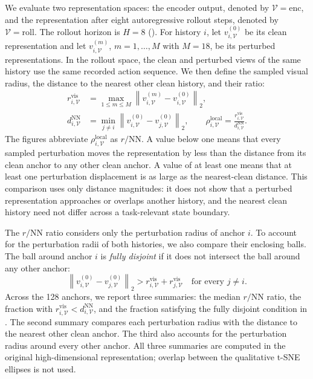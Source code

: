 We evaluate two representation spaces: the encoder output, denoted by
$\mathcal V=\mathrm{enc}$, and the representation after eight autoregressive
rollout steps, denoted by $\mathcal V=\mathrm{roll}$. The rollout horizon is
$H=8$ (). For history $i$, let
$v_{i,\mathcal V}^{(0)}$ be its clean representation and let
$v_{i,\mathcal V}^{(m)}$, $m=1,\ldots,M$ with $M=18$, be its perturbed
representations. In the rollout space, the clean and perturbed views of the
same history use the same recorded action sequence. We then define the sampled
visual radius, the distance to the nearest other clean history, and their ratio:
\begin{align}
r_{i,\mathcal V}^{\mathrm{vis}}
&=\max_{1\leq m\leq M}
\left\|v_{i,\mathcal V}^{(m)}-v_{i,\mathcal V}^{(0)}\right\|_2,
\nonumber\\
d_{i,\mathcal V}^{\mathrm{NN}}
&=\min_{j\neq i}
\left\|v_{i,\mathcal V}^{(0)}-v_{j,\mathcal V}^{(0)}\right\|_2,
\qquad
\rho_{i,\mathcal V}^{\mathrm{local}}
=\frac{r_{i,\mathcal V}^{\mathrm{vis}}}
{d_{i,\mathcal V}^{\mathrm{NN}}}.
\label{eq:local-radius-spacing}
\end{align}
The figures abbreviate $\rho_{i,\mathcal V}^{\mathrm{local}}$ as
$r/\mathrm{NN}$. A value below one means that every sampled perturbation moves
the representation by less than the distance from its clean anchor to any
other clean anchor. A value of at least one means that at least one
perturbation displacement is as large as the nearest-clean distance. This
comparison uses only distance magnitudes: it does not show that a perturbed
representation approaches or overlaps another history, and the nearest clean
history need not differ across a task-relevant state boundary.

The $r/\mathrm{NN}$ ratio considers only the perturbation radius of anchor
$i$. To account for the perturbation radii of both histories, we also compare
their enclosing balls. The ball around anchor $i$ is \emph{fully disjoint} if
it does not intersect the ball around any other anchor:
\begin{equation}
\left\|v_{i,\mathcal V}^{(0)}-v_{j,\mathcal V}^{(0)}\right\|_2
>
r_{i,\mathcal V}^{\mathrm{vis}}+r_{j,\mathcal V}^{\mathrm{vis}}
\quad\text{for every }j\neq i.
\label{eq:local-cloud-disjoint}
\end{equation}
Across the 128 anchors, we report three summaries: the median
$r/\mathrm{NN}$ ratio, the fraction with
$r_{i,\mathcal V}^{\mathrm{vis}}<d_{i,\mathcal V}^{\mathrm{NN}}$, and the
fraction satisfying the fully disjoint condition in
. The second summary compares each perturbation
radius with the distance to the nearest other clean anchor. The third also
accounts for the perturbation radius around every other anchor. All three
summaries are computed in the original high-dimensional representation;
overlap between the qualitative t-SNE ellipses is not used.


